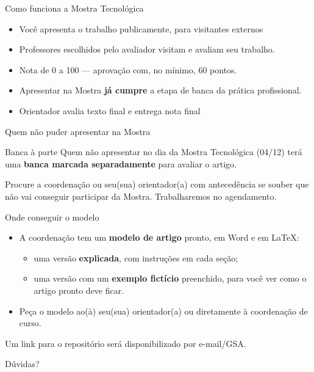 \documentclass[12pt,aspectratio=169]{beamer}
\begin{document}
\begin{frame}{Como funciona a Mostra Tecnológica}
  \begin{itemize}
    \item Você apresenta o trabalho publicamente, para visitantes externos
    \item Professores escolhidos pelo avaliador visitam e avaliam seu trabalho.
    \item Nota de 0 a 100 --- aprovação com, no mínimo, 60 pontos.
    \item Apresentar na Mostra \textbf{já cumpre} a etapa de banca da
          prática profissional.
    \item Orientador avalia texto final e entrega nota final
  \end{itemize}
\end{frame}

\begin{frame}{Quem não puder apresentar na Mostra}
  \begin{alertblock}{Banca à parte}
    Quem não apresentar no dia da Mostra Tecnológica (04/12) terá uma
    \textbf{banca marcada separadamente} para avaliar o artigo.
  \end{alertblock}
  \vfill
  Procure a coordenação ou seu(sua) orientador(a) com antecedência se
  souber que não vai conseguir participar da Mostra. Trabalharemos no agendamento.
\end{frame}

\begin{frame}{Onde conseguir o modelo}
  \begin{itemize}
    \item A coordenação tem um \textbf{modelo de artigo} pronto, em Word e
          em LaTeX:
    \begin{itemize}
      \item uma versão \textbf{explicada}, com instruções em cada seção;
      \item uma versão com um \textbf{exemplo fictício} preenchido, para
            você ver como o artigo pronto deve ficar.
    \end{itemize}
    \item Peça o modelo ao(à) seu(sua) orientador(a) ou diretamente à
          coordenação de curso.
  \end{itemize}
  Um link para o repositório será disponibilizado por e-mail/GSA.
\end{frame}

\begin{frame}[standout]
  Dúvidas?
\end{frame}
\end{document}
